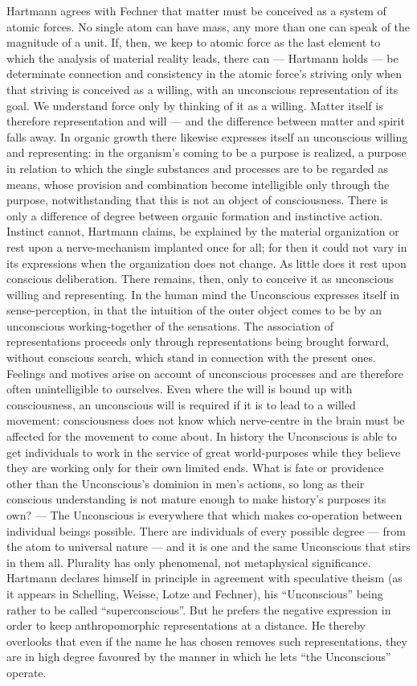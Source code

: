 \documentclass[12pt,a4paper]{book}
\newcommand{\opage}[1]{\marginnote{\footnotesize\textit{[#1]}}}
\begin{document}
Hartmann agrees with Fechner that matter must be conceived as a system of atomic
forces. No single atom can have mass, any more than one can speak of the
magnitude of a unit. If, then, we keep to atomic force as the last element to
which the analysis of material reality leads, there can --- Hartmann holds --- be
determinate connection and consistency in the atomic force's striving only when
that striving is conceived as a willing, with an unconscious representation of
its goal. We understand force only by thinking of it as a willing. Matter itself
is therefore representation and will --- and the difference between matter and
spirit falls away. In organic growth there likewise expresses itself an
unconscious willing and representing: in the organism's coming to be a purpose is
realized, a purpose in relation to which the single substances and processes are
to be regarded as means, whose provision and combination become intelligible only
through the purpose, notwithstanding that this is not an object of consciousness.
There is only a difference of degree between organic formation and instinctive
action. Instinct cannot, Hartmann claims, be explained by the material
organization or rest upon a nerve-mechanism implanted once for all; for then it
could not vary in its expressions when the organization does not change. As
little does it rest upon conscious deliberation. There remains, then, only to
conceive it as unconscious willing and representing. In the human mind the
Unconscious expresses itself in sense-perception, in that the intuition of the
outer object comes to be by an unconscious working-together of the sensations.
The association of representations proceeds only through representations being
brought forward, without conscious search, which stand in connection with the
present ones. Feelings and motives arise on account of unconscious processes and
are therefore often unintelligible to ourselves. Even where the will is bound up
with consciousness, an unconscious will is required if it is to lead to a willed
movement: consciousness does not know which nerve-centre in the brain must be
affected for the movement to come about. In history the Unconscious is able to
get individuals to work in the service of great \opage{538}world-purposes while they believe
they are working only for their own limited ends. What is fate or providence
other than the Unconscious's dominion in men's actions, so long as their conscious
understanding is not mature enough to make history's purposes its own? --- The
Unconscious is everywhere that which makes co-operation between individual beings
possible. There are individuals of every possible degree --- from the atom to
universal nature --- and it is one and the same Unconscious that stirs in them
all. Plurality has only phenomenal, not metaphysical significance. Hartmann
declares himself in principle in agreement with speculative theism (as it appears
in Schelling, Weisse, Lotze and Fechner), his ``Unconscious'' being rather to be
called ``superconscious''. But he prefers the negative expression in order to
keep anthropomorphic representations at a distance. He thereby overlooks that
even if the name he has chosen removes such representations, they are in high
degree favoured by the manner in which he lets ``the Unconscious'' operate.
\end{document}
